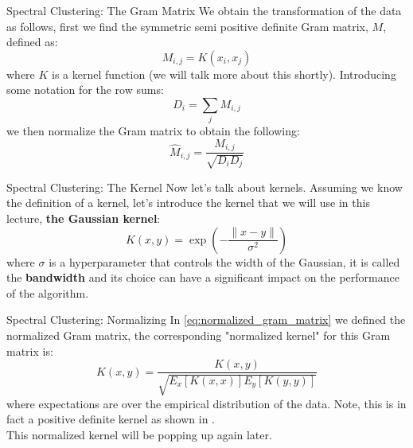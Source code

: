 \documentclass[aspectratio=169]{beamer}
\begin{document}
\begin{frame}{Spectral Clustering: The Gram Matrix}
  We obtain the transformation of the data as follows, first we find the symmetric semi positive definite Gram matrix, $M$, defined as:
  \begin{equation*}
    M_{i,j} = K(x_{i},x_{j})
  \end{equation*}
  where $K$ is a kernel function (we will talk more about this shortly). Introducing some notation for the row sums:
  \begin{equation*}
    D_{i} = \sum_{j} M_{i,j}
  \end{equation*}
  we then normalize the Gram matrix to obtain the following:
  \begin{equation} \label{eq:normalized_gram_matrix}
    \hat{M}_{i,j} = \frac{M_{i,j}}{\sqrt{D_{i}D_{j}}}
  \end{equation}
\end{frame}

\begin{frame}{Spectral Clustering: The Kernel}
  Now let's talk about kernels. Assuming we know the definition of a kernel, let's introduce the kernel that we will use in this lecture, \textbf{the Gaussian kernel}:
  \begin{equation} \label{eq:gaussian_kernel}
    K(x,y) = \exp\left(-\frac{\|x-y\|}{\sigma^{2}}\right)
  \end{equation}
  where $\sigma$ is a hyperparameter that controls the width of the Gaussian, it is called the \textbf{bandwidth} and its choice can have a significant impact on the performance of the algorithm.
\end{frame}

\begin{frame}{Spectral Clustering: Normalizing}
  In \cref{eq:normalized_gram_matrix} we defined the normalized Gram matrix, the corresponding "normalized kernel" for this Gram matrix is:
  \begin{equation} \label{eq:normalized_kernel}
    \hat{K}(x,y) = \frac{K(x,y)}{\sqrt{E_{x}[K(x,x)] E_{y}[K(y,y)]}}
  \end{equation}
  where expectations are over the empirical distribution of the data. Note, this is in fact a positive definite kernel as shown in \cite{bengio2003learning}. 
  \\ \hfill \break
  This normalized kernel will be popping up again later.
\end{frame}
\end{document}
